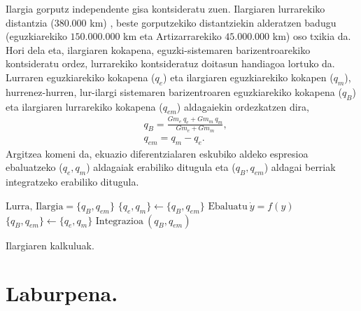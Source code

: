 Ilargia gorputz independente gisa kontsideratu zuen. Ilargiaren lurrarekiko distantzia ($380.000$ km) , beste gorputzekiko distantziekin alderatzen badugu (eguzkiarekiko $150.000.000$ km eta Artizarrarekiko $45.000.000$ km) oso txikia da. Hori dela eta, ilargiaren kokapena, eguzki-sistemaren barizentroarekiko kontsideratu ordez, lurrarekiko kontsideratuz doitasun handiagoa lortuko da. Lurraren eguzkiarekiko kokapena ($q_e$) eta ilargiaren eguzkiarekiko kokapen ($q_m$), hurrenez-hurren, lur-ilargi sistemaren barizentroaren eguzkiarekiko kokapena ($q_B$) eta  ilargiaren lurrarekiko kokapena ($q_{em}$) aldagaiekin ordezkatzen dira,
\begin{align*}
& q_B =\frac{Gm_e \ q_e+Gm_m \ q_m}{Gm_e+Gm_m},\\
& q_{em} =q_m-q_e.
\end{align*}
Argitzea komeni da, ekuazio diferentzialaren eskubiko aldeko espresioa ebaluatzeko ($q_e,q_m$) aldagaiak erabiliko ditugula eta ($q_B,q_{em}$) aldagai berriak  integratzeko erabiliko ditugula.

\begin{algorithm}[H]
 \BlankLine
  $\mbox{Lurra, Ilargia}=\{q_B,q_{em}\}$\;
  {
   \BlankLine
     $\{q_e,q_m\} \leftarrow \{q_B,q_{em}\} $\;
     $\mbox{Ebaluatu} \ \dot{y}=f(y)$\;
     $ \{q_B,q_{em}\} \leftarrow \{q_e,q_m\} $\;
     $\mbox{Integrazioa}\ (q_B,q_{em})$\;
   \BlankLine
  }
 \caption{Ilargiaren kalkuluak.}
\end{algorithm}

\begin{table}[h]
\caption{Ilargiaren Lurrarekiko hasierako balioak.}
\label{tab:1}       %
\centering
{}
\end{table}     
          

\section{Laburpena.}

